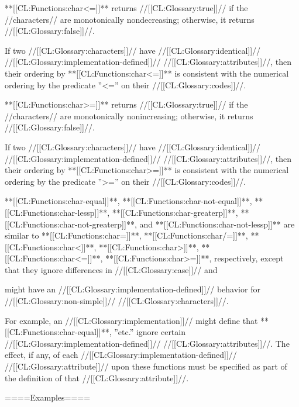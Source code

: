 **[[CL:Functions:char<=]]** returns //[[CL:Glossary:true]]// if the //characters// are monotonically nondecreasing; otherwise, it returns //[[CL:Glossary:false]]//.

If two //[[CL:Glossary:characters]]// have //[[CL:Glossary:identical]]// //[[CL:Glossary:implementation-defined]]// //[[CL:Glossary:attributes]]//, then their ordering by **[[CL:Functions:char<=]]** is consistent with the numerical ordering by the predicate ''<='' on their //[[CL:Glossary:codes]]//.


**[[CL:Functions:char>=]]** returns //[[CL:Glossary:true]]// if the //characters// are monotonically nonincreasing; otherwise, it returns //[[CL:Glossary:false]]//.

If two //[[CL:Glossary:characters]]// have //[[CL:Glossary:identical]]// //[[CL:Glossary:implementation-defined]]// //[[CL:Glossary:attributes]]//, then their ordering by **[[CL:Functions:char>=]]** is consistent with the numerical ordering by the predicate ''>='' on their //[[CL:Glossary:codes]]//.

**[[CL:Functions:char-equal]]**, **[[CL:Functions:char-not-equal]]**, **[[CL:Functions:char-lessp]]**, **[[CL:Functions:char-greaterp]]**, **[[CL:Functions:char-not-greaterp]]**, and **[[CL:Functions:char-not-lessp]]** are similar to **[[CL:Functions:char=]]**, **[[CL:Functions:char/=]]**, **[[CL:Functions:char<]]**, **[[CL:Functions:char>]]**, **[[CL:Functions:char<=]]**, **[[CL:Functions:char>=]]**, respectively, except that they ignore differences in //[[CL:Glossary:case]]// and

might have an //[[CL:Glossary:implementation-defined]]// behavior for //[[CL:Glossary:non-simple]]// //[[CL:Glossary:characters]]//.

For example, an //[[CL:Glossary:implementation]]// might define that **[[CL:Functions:char-equal]]**, ''etc.'' ignore certain //[[CL:Glossary:implementation-defined]]// //[[CL:Glossary:attributes]]//. The effect, if any, of each //[[CL:Glossary:implementation-defined]]// //[[CL:Glossary:attribute]]// upon these functions must be specified as part of the definition of that //[[CL:Glossary:attribute]]//.

====Examples====


